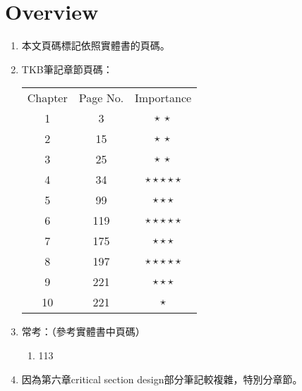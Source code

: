 \section{Overview}

\begin{enumerate}
    \item 本文頁碼標記依照實體書\cite{1}的頁碼。
    \item TKB筆記\cite{2}章節頁碼：
    \begin{table}[H]
        \centering
        \begin{tabular}{|c|c|c|}
            \hline
            Chapter & Page No. & Importance \\
            \Xhline{2\arrayrulewidth}
            1 & 3 & $\star \ \star$ \\
            \hline
            2 & 15 & $\star \ \star$ \\
            \hline
            3 & 25 & $\star \ \star$ \\
            \hline
            4 & 34 & $\star\star\star\star\star$ \\
            \hline
            5 & 99 & $\star\star\star$ \\
            \hline
            6 & 119 & $\star\star\star\star\star$ \\
            \hline
            7 & 175 & $\star\star\star$ \\
            \hline
            8 & 197 & $\star\star\star\star\star$ \\
            \hline
            9 & 221 & $\star\star\star$ \\
            \hline
            10 & 221 & $\star$ \\
            \hline
        \end{tabular}
    \end{table}
    \item 常考：（參考實體書\cite{1}中頁碼）
    \begin{enumerate}
        \item 113 
    \end{enumerate}
    \item 因為第六章critical section design部分筆記較複雜，特別分章節。
\end{enumerate}

\pagebreak